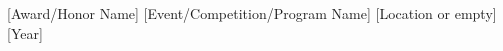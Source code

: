 



\begin{cvhonors}

%
  \cvhonor
    {[Award/Honor Name]} %
    {[Event/Competition/Program Name]} %
    {[Location or empty]} %
    {[Year]} %


\end{cvhonors}


%
%
%
%
